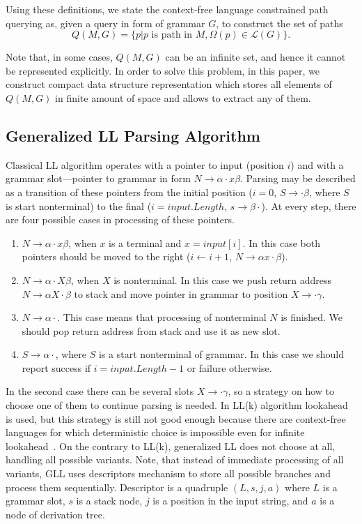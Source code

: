 Using these definitions, we state the context-free language constrained path querying as, given a query in form of grammar $G$, to construct the set of paths $$Q(M,G)=\{p|p \text{ is path in } M, \Omega(p) \in \mathcal{L}(G)\}.$$

Note that, in some cases, $Q(M,G)$ can be an infinite set, and hence it cannot be represented explicitly. 
In order to solve this problem, in this paper, we construct compact data structure representation which stores all elements of $Q(M,G)$ in finite amount of space and allows to extract any of them.

\subsection{Generalized LL Parsing Algorithm}\label{BasicGLL}

Classical LL algorithm operates with a pointer to input (position $i$) and with a grammar slot---pointer to grammar in form $N \rightarrow \alpha \cdot x \beta $.
Parsing may be described as a transition of these pointers from the initial position ($i = 0$, $S \rightarrow \cdot \beta $, where $S$ is start nonterminal) to the final ($i = input.Length$, $s \rightarrow \beta \cdot$).
At every step, there are four possible cases in processing of these pointers. 

\begin{enumerate}
\item $N \rightarrow \alpha \cdot x \beta $, when $x$ is a terminal and $x = input[i]$. In this case both pointers should be moved to the right ($i \leftarrow i + 1$, $N \rightarrow \alpha  x \cdot \beta $).
\item $N \rightarrow \alpha \cdot X \beta $, when $X$ is nonterminal. In this case we push return address $N \rightarrow \alpha X \cdot \beta $ to stack and move pointer in grammar to position $X \rightarrow \cdot \gamma$.\label{itm:2}
\item $N \rightarrow \alpha \cdot $. This case means that processing of nonterminal $N$ is finished. We should pop return address from stack and use it as new slot.\label{itm:3}
\item $S \rightarrow \alpha \cdot $, where $S$ is a start nonterminal of grammar. In this case we should report success if $i = input.Length - 1$ or failure otherwise. 
\end{enumerate}

In the second case there can be several slots $X \rightarrow \cdot \gamma$, so a strategy on how to choose one of them to continue parsing is needed.
In LL(k) algorithm lookahead is used, but this strategy is still not good enough because there are context-free languages for which deterministic choice is impossible even for infinite lookahead~\cite{LLnonLL}.
On the contrary to LL(k), generalized LL does not choose at all, handling all possible variants.
Note, that instead of immediate processing of all variants, GLL uses descriptors mechanism to store all possible branches and process them sequentially. 
Descriptor is a quadruple $(L, s, j, a)$ where $L$ is a grammar slot, $s$ is a stack node, $j$ is a position in the input string, and $a$ is a node of derivation tree. 

